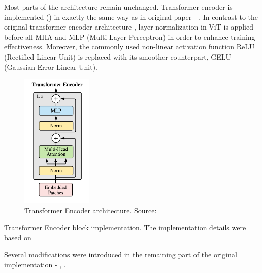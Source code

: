 Most parts of the architecture remain unchanged.
Transformer encoder is implemented () in exactly the same way as in original paper - .
In contrast to the original transformer encoder architecture \cite{Vaswani2017}, layer normalization in ViT is applied before all MHA and MLP (Multi Layer Perceptron) in order to enhance training effectiveness.
Moreover, the commonly used non-linear activation function ReLU (Rectified Linear Unit) is replaced with its smoother counterpart, GELU (Gaussian-Error Linear Unit).

\begin{figure}[H] 
  \centering     
  \includegraphics[width=0.3\textwidth]{img/transformer-encoder.png} 
  \caption{Transformer Encoder architecture. Source: \cite{vitPaper}}
  \label{fig:transformer-encoder}
\end{figure}

\newenvironment{longlistingA}{\captionsetup{type=listing, width=0.8\textwidth}}{}
\begin{longlistingA}
    \caption{Transformer Encoder block implementation. The implementation details were based on \cite{d2lViT}}
    \label{lst:transformer_encoder}
\end{longlistingA}
\vspace{12pt}

Several modifications were introduced in the remaining part of the original implementation - , .

